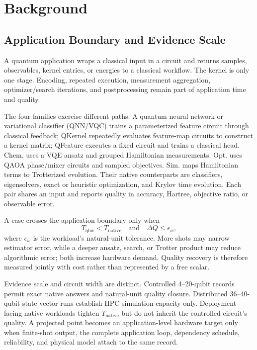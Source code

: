 \section{Background}

\subsection{Application Boundary and Evidence Scale}

A quantum application wraps a classical input in a circuit and returns samples, observables, kernel entries, or energies to a classical workflow. The kernel is only one stage. Encoding, repeated execution, measurement aggregation, optimizer/search iterations, and postprocessing remain part of application time and quality.

The four families exercise different paths. A quantum neural network or variational classifier (QNN/VQC) trains a parameterized feature circuit through classical feedback; QKernel repeatedly evaluates feature-map circuits to construct a kernel matrix; QFeature executes a fixed circuit and trains a classical head. Chem. uses a VQE ansatz and grouped Hamiltonian measurements. Opt. uses QAOA phase/mixer circuits and sampled objectives. Sim. maps Hamiltonian terms to Trotterized evolution. Their native counterparts are classifiers, eigensolvers, exact or heuristic optimization, and Krylov time evolution. Each pair shares an input and reports quality in accuracy, Hartree, objective ratio, or observable error.

A case crosses the application boundary only when
\[
T_{\mathrm{qhw}}<T_{\mathrm{native}}
\quad\text{and}\quad
\Delta Q\leq\epsilon_w,
\]
where $\epsilon_w$ is the workload's natural-unit tolerance. More shots may narrow estimator error, while a deeper ansatz, search, or Trotter product may reduce algorithmic error; both increase hardware demand. Quality recovery is therefore measured jointly with cost rather than represented by a free scalar.

Evidence scale and circuit width are distinct. Controlled 4--20-qubit records permit exact native answers and natural-unit quality closure. Distributed 36--40-qubit state-vector runs establish HPC simulation capacity only. Deployment-facing native workloads tighten $T_{\mathrm{native}}$ but do not inherit the controlled circuit's quality. A projected point becomes an application-level hardware target only when finite-shot output, the complete application loop, dependency schedule, reliability, and physical model attach to the same record.

